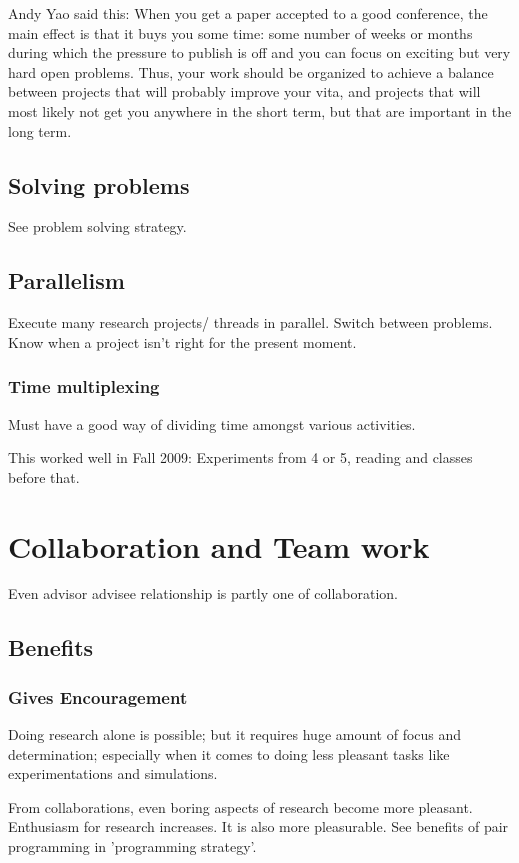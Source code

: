 \documentclass[oneside, article]{memoir}
\begin{document}
Andy Yao said this: When you get a paper accepted to a good conference, the main effect is that it buys you some time: some number of weeks or months during which the pressure to publish is off and you can focus on exciting but very hard open problems. Thus, your work should be organized to achieve a balance between projects that will probably improve your vita, and projects that will most likely not get you anywhere in the short term, but that are important in the long term.

\subsection{Solving problems}
See problem solving strategy.

\subsection{Parallelism}
Execute many research projects/ threads in parallel. Switch between problems. Know when a project isn't right for the present moment.

\subsubsection{Time multiplexing}
Must have a good way of dividing time amongst various activities.

This worked well in Fall 2009: Experiments from 4 or 5, reading and classes before that.

\section{Collaboration and Team work}
Even advisor advisee relationship is partly one of collaboration.

\subsection{Benefits}
\subsubsection{Gives Encouragement}
Doing research alone is possible; but it requires huge amount of focus and determination; especially when it comes to doing less pleasant tasks like experimentations and simulations.

From collaborations, even boring aspects of research become more pleasant. Enthusiasm for research increases. It is also more pleasurable. See benefits of pair programming in 'programming strategy'.
\end{document}
